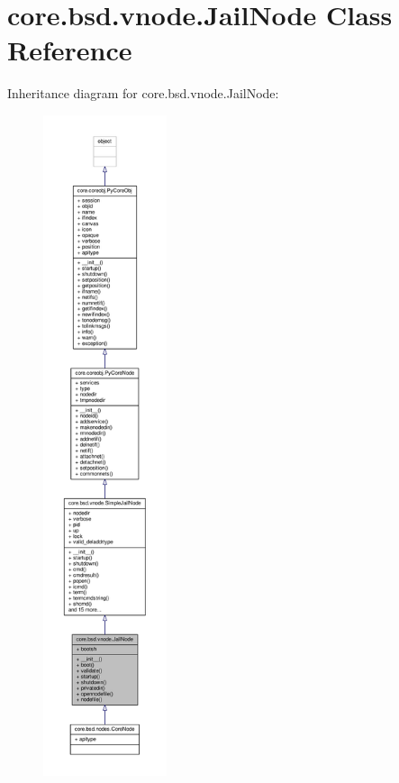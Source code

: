 \hypertarget{classcore_1_1bsd_1_1vnode_1_1_jail_node}{\section{core.\+bsd.\+vnode.\+Jail\+Node Class Reference}
\label{classcore_1_1bsd_1_1vnode_1_1_jail_node}
}


Inheritance diagram for core.\+bsd.\+vnode.\+Jail\+Node\+:
\nopagebreak
\begin{figure}[H]
\begin{center}
\leavevmode
\includegraphics[height=550pt]{classcore_1_1bsd_1_1vnode_1_1_jail_node__inherit__graph}
\end{center}
\end{figure}


